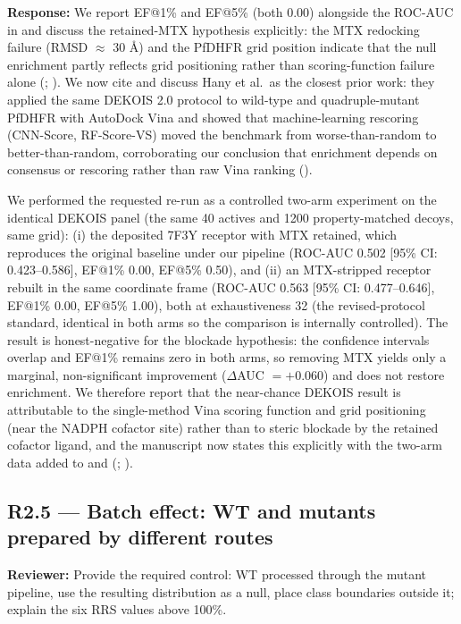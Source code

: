\documentclass[11pt]{article}
\begin{document}
\textbf{Response:} We report EF@1\% and EF@5\% (both 0.00) alongside the ROC-AUC in
 and discuss the retained-MTX hypothesis explicitly: the MTX redocking failure
(RMSD $\approx$ 30 \AA) and the PfDHFR grid position indicate that the null enrichment partly
reflects grid positioning rather than scoring-function failure alone (; ).
We now cite and discuss Hany et al.\ as the closest prior work: they applied the same DEKOIS
2.0 protocol to wild-type and quadruple-mutant PfDHFR with AutoDock Vina and showed that
machine-learning rescoring (CNN-Score, RF-Score-VS) moved the benchmark from worse-than-random
to better-than-random, corroborating our conclusion that enrichment depends on consensus or
rescoring rather than raw Vina ranking ().

We performed the requested re-run as a controlled two-arm experiment on the identical DEKOIS
panel (the same 40 actives and 1200 property-matched decoys, same grid): (i) the deposited 7F3Y
receptor with MTX retained, which reproduces the original baseline under our pipeline
(ROC-AUC 0.502 [95\% CI: 0.423--0.586], EF@1\% 0.00, EF@5\% 0.50), and (ii) an MTX-stripped
receptor rebuilt in the same coordinate frame (ROC-AUC 0.563 [95\% CI: 0.477--0.646],
EF@1\% 0.00, EF@5\% 1.00), both at exhaustiveness 32 (the revised-protocol standard, identical
in both arms so the comparison is internally controlled). The result is honest-negative for the
blockade hypothesis: the confidence intervals overlap and EF@1\% remains zero in both arms, so
removing MTX yields only a marginal, non-significant improvement ($\Delta$AUC $= +0.060$) and
does not restore enrichment. We therefore report that the near-chance DEKOIS result is
attributable to the single-method Vina scoring function and grid positioning (near the NADPH
cofactor site) rather than to steric blockade by the retained cofactor ligand, and the manuscript
now states this explicitly with the two-arm data added to 
and  (; ).

\subsection*{R2.5 --- Batch effect: WT and mutants prepared by different routes}
\textbf{Reviewer:} Provide the required control: WT processed through the mutant pipeline,
use the resulting distribution as a null, place class boundaries outside it; explain the six
RRS values above 100\%.
\end{document}
